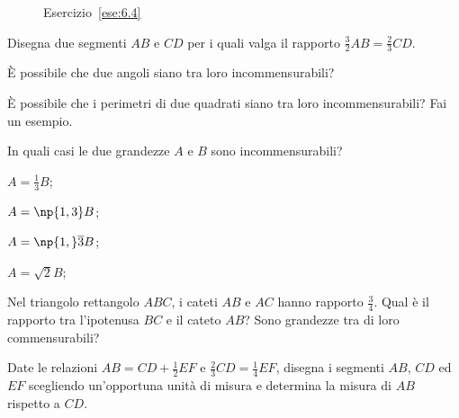 \begin{inaccessibleblock}
 \begin{figure}[!htb]
	\centering
	\caption{Esercizio~\ref{ese:6.4}}\label{fig:ese6.4}
\end{figure}
\end{inaccessibleblock}

\begin{esercizio}
\label{ese:6.5}
Disegna due segmenti $AB$ e $CD$ per i quali valga il rapporto 
$\frac{3}{2}AB=\frac{2}{3}CD$.
\end{esercizio}

\begin{esercizio}
\label{ese:6.6}
\`E possibile che due angoli siano tra loro incommensurabili?
\end{esercizio}

\begin{esercizio}
\label{ese:6.7}
\`E possibile che i perimetri di due quadrati siano tra loro 
incommensurabili? Fai un esempio.
\end{esercizio}

\begin{esercizio}
\label{ese:6.8}
In quali casi le due grandezze $A$ e $B$ sono incommensurabili?
\begin{multicols}{4}
\begin{enumeratea}
\item $A=\frac{1}{3}B$;
\item $A=\np{1,3}B$;
\item $A=\np{1,}\overline{3}B$;
\item $A=\sqrt{2}B$;
\end{enumeratea}
\end{multicols}
\end{esercizio}

\begin{esercizio}
\label{ese:6.9}
Nel triangolo rettangolo $ABC$, i cateti $AB$ e $AC$ hanno rapporto 
$\frac{3}{4}$. Qual è il rapporto tra  l'ipotenusa $BC$ e il cateto 
$AB$? Sono grandezze tra di loro commensurabili?
\end{esercizio}

\begin{esercizio}
\label{ese:6.10}
Date le relazioni $AB=CD+\frac{1}{2}EF$ e 
$\frac{2}{3}CD=\frac{1}{4}EF$, disegna i segmenti $AB$, $CD$ ed $EF$ 
scegliendo un'opportuna unità di misura e determina la misura di $AB$ 
rispetto a $CD$.
\end{esercizio}

